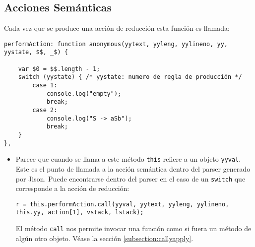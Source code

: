\subsection{Acciones Semánticas}
Cada vez que se produce una acción de reducción esta función es llamada:
\begin{verbatim}
performAction: function anonymous(yytext, yyleng, yylineno, yy, yystate, $$, _$) {

    var $0 = $$.length - 1;
    switch (yystate) { /* yystate: numero de regla de producción */
        case 1:
            console.log("empty");
            break;
        case 2:
            console.log("S -> aSb");
            break;
    }
},
\end{verbatim}
\begin{itemize}
\item
Parece que  cuando se llama a este método \verb|this| refiere a un objeto \verb|yyval|. Este es el
punto  de llamada a la acción semántica dentro del parser generado por Jison.
Puede encontrarse dentro del parser en el caso de un \verb|switch| 
que corresponde a la acción de reducción:
\begin{verbatim}
r = this.performAction.call(yyval, yytext, yyleng, yylineno, this.yy, action[1], vstack, lstack);
\end{verbatim}
El método \verb|call|
nos permite invocar una función como si fuera un método de algún otro 
objeto. Véase la sección 
\ref{subsection:callyapply}.


\end{itemize}

